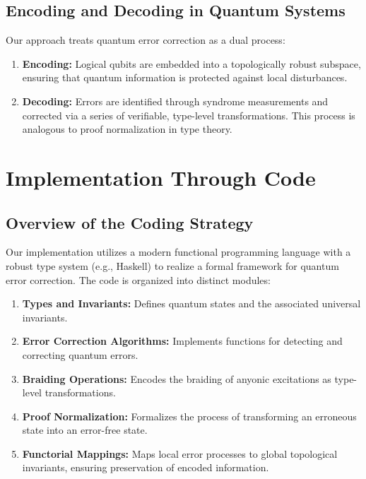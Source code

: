\documentclass[12pt]{article}
\begin{document}
\subsection{Encoding and Decoding in Quantum Systems}
Our approach treats quantum error correction as a dual process:
\begin{enumerate}[label=(\alph*)]
    \item \textbf{Encoding:} Logical qubits are embedded into a topologically robust subspace, ensuring that quantum information is protected against local disturbances.
    \item \textbf{Decoding:} Errors are identified through syndrome measurements and corrected via a series of verifiable, type-level transformations. This process is analogous to proof normalization in type theory.
\end{enumerate}

\section{Implementation Through Code}
\subsection{Overview of the Coding Strategy}
Our implementation utilizes a modern functional programming language with a robust type system (e.g., Haskell) to realize a formal framework for quantum error correction. The code is organized into distinct modules:
\begin{enumerate}[label=\textbf{Module \arabic*:}, leftmargin=*, labelsep=1em]
    \item \textbf{Types and Invariants:} Defines quantum states and the associated universal invariants.
    \item \textbf{Error Correction Algorithms:} Implements functions for detecting and correcting quantum errors.
    \item \textbf{Braiding Operations:} Encodes the braiding of anyonic excitations as type-level transformations.
    \item \textbf{Proof Normalization:} Formalizes the process of transforming an erroneous state into an error-free state.
    \item \textbf{Functorial Mappings:} Maps local error processes to global topological invariants, ensuring preservation of encoded information.
\end{enumerate}
\end{document}
